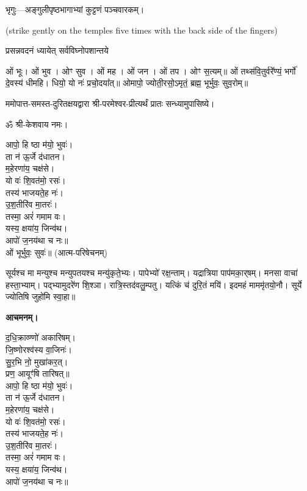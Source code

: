 
भृगुः—अङ्गुलीपृष्ठभागाभ्यां कुट्टणं पञ्चवारकम्।

{\scriptsize (strike gently on the temples five times with the back side of the fingers)}

{प्रसन्नवदनं ध्यायेत् सर्वविघ्नोपशान्तये}


ओं भूः। ओं भुव। ओꣳ सुव। ओं मह। ओं जन। ओं तप। ओꣳ स॒त्यम्॥
ओं तथ्स॑वि॒तुर्वरे᳚ण्यं॒ भर्गो॑ दे॒वस्य॑ धीमहि। धियो॒ यो नः॑ प्रचो॒दया᳚त्॥
ओमापो॒ ज्योती॒रसो॒ऽमृतं॒ ब्रह्म॒ भूर्भुवः॒ सुव॒रोम्॥


ममोपात्त-समस्त-दुरितक्षयद्वारा श्री-परमेश्वर-प्रीत्यर्थं प्रातः सन्ध्यामुपासिष्ये।


ॐ श्री-केशवाय नमः।

आपो॒ हि ष्ठा म॑यो॒ भुवः॑।\\
ता न॑ ऊ॒र्जे द॑धातन।\\
म॒हेरणा॑य॒ चक्ष॑से।\\
यो वः॑ शि॒वत॑मो॒ रसः॑।\\
तस्य॑ भाजयते॒ह नः॑।\\
उ॒श॒तीरि॑व मा॒तरः॑।\\
तस्मा॒ अरं॑ गमाम वः।\\
यस्य॒ क्षया॑य॒ जिन्व॑थ।\\
आपो॑ ज॒नय॑था च नः॥\\

ओं भूर्भुवः॒ सुवः॑॥ (आत्म-परिषेचनम्)



सूर्यश्च मा मन्युश्च मन्युपतयश्च मन्यु॑कृते॒भ्यः। पापेभ्यो॑ रक्ष॒न्ताम्। यद्रात्रिया पाप॑मका॒र्‌षम्। मनसा वाचा॑ हस्ता॒भ्याम्। पद्भ्यामुदरे॑ण शि॒श्ञा। रात्रि॒स्तद॑वलु॒म्पतु। यत्किं च॑ दुरि॒तं मयि॑। इदमहं माममृ॑तयो॒नौ। सूर्ये ज्योतिषि जुहो॑मि स्वा॒हा॥


\textbf{आचमनम्।}

द॒धि॒क्राव्ण्णो॑ अकारिषम्।\\
 जि॒ष्णोरश्व॑स्य वा॒जिनः॑।\\
सु॒र॒भि नो॒ मुखा॑कर॒त्।\\
प्रण॒ आयूꣳ॑षि तारिषत्॥\\



आपो॒ हि ष्ठा म॑यो॒ भुवः॑।\\
ता न॑ ऊ॒र्जे द॑धातन।\\
म॒हेरणा॑य॒ चक्ष॑से।\\
यो वः॑ शि॒वत॑मो॒ रसः॑।\\
तस्य॑ भाजयते॒ह नः॑।\\
उ॒श॒तीरि॑व मा॒तरः॑।\\
तस्मा॒ अरं॑ गमाम वः।\\
यस्य॒ क्षया॑य॒ जिन्व॑थ।\\
आपो॑ ज॒नय॑था च नः॥\\

